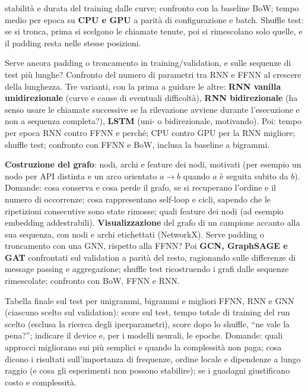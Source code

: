 \begin{description}[style=nextline,leftmargin=1.2em]
  stabilità e durata del training dalle curve; confronto con la baseline BoW; tempo medio per epoca
  su \textbf{CPU e GPU} a parità di configurazione e batch. Shuffle test: se si tronca, prima si
  scelgono le chiamate tenute, poi si rimescolano solo quelle, e il padding resta nelle stesse
  posizioni.
\item[Task 4 -- RNN, ordine completo e lunghezza qualsiasi]
  Serve ancora padding o troncamento in training/validation, e sulle sequenze di test più lunghe?
  Confronto del numero di parametri tra RNN e FFNN al crescere della lunghezza. Tre varianti, con la
  prima a guidare le altre: \textbf{RNN vanilla unidirezionale} (curve e cause di eventuali
  difficoltà), \textbf{RNN bidirezionale} (ha senso usare le chiamate successive se la rilevazione
  avviene durante l'esecuzione e non a sequenza completa?), \textbf{LSTM} (uni- o bidirezionale,
  motivando). Poi: tempo per epoca RNN contro FFNN e perché; CPU contro GPU per la RNN migliore;
  shuffle test; confronto con FFNN e BoW, inclusa la baseline a bigrammi.
\item[Task 5 -- GNN, la sequenza come grafo]
  \textbf{Costruzione del grafo}: nodi, archi e feature dei nodi, motivati (per esempio un nodo per
  API distinta e un arco orientato $a \to b$ quando $a$ è seguita subito da $b$). Domande: cosa
  conserva e cosa perde il grafo, se si recuperano l'ordine e il numero di occorrenze; cosa
  rappresentano self-loop e cicli, sapendo che le ripetizioni consecutive sono state rimosse; quali
  feature dei nodi (ad esempio embedding addestrabili). \textbf{Visualizzazione} del grafo di un
  campione accanto alla sua sequenza, con nodi e archi etichettati (NetworkX). Serve padding o
  troncamento con una GNN, rispetto alla FFNN? Poi \textbf{GCN, GraphSAGE e GAT} confrontati sul
  validation a parità del resto, ragionando sulle differenze di message passing e aggregazione;
  shuffle test ricostruendo i grafi dalle sequenze rimescolate; confronto con BoW, FFNN e RNN.
\item[Task 6 -- Verdetto: dove si fermano i guadagni?]
  Tabella finale sul test per unigrammi, bigrammi e migliori FFNN, RNN e GNN (ciascuno scelto sul
  validation): score sul test, tempo totale di training del run scelto (esclusa la ricerca degli
  iperparametri), score dopo lo shuffle, ``ne vale la pena?''; indicare il device e, per i modelli
  neurali, le epoche. Domande: quali approcci migliorano sui più semplici e quando la complessità non
  paga; cosa dicono i risultati sull'importanza di frequenze, ordine locale e dipendenze a lungo
  raggio (e cosa gli esperimenti non possono stabilire); se i guadagni giustificano costo e
  complessità.
\end{description}

